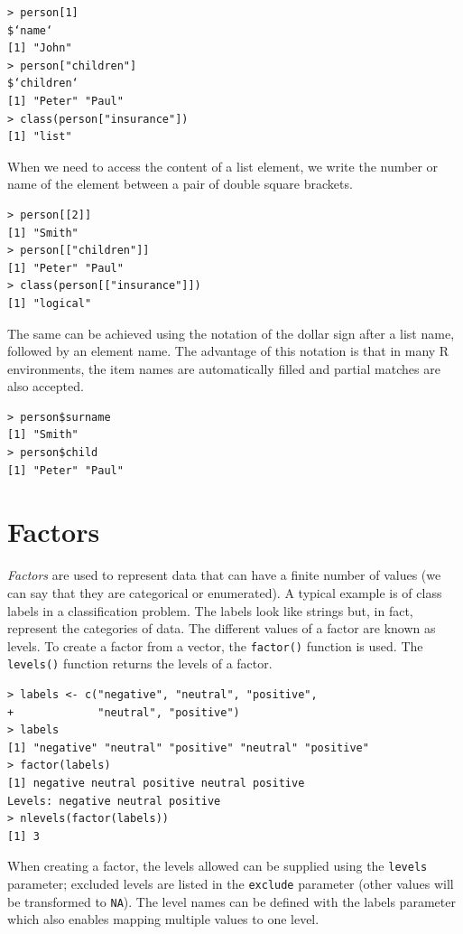 \begin{verbatim}
> person[1]
$‘name‘
[1] "John"
> person["children"]
$‘children‘
[1] "Peter" "Paul"
> class(person["insurance"])
[1] "list"
\end{verbatim}

When we need to access the content of a list element, we write the number or
name of the element between a pair of double square brackets.

\begin{verbatim}
> person[[2]]
[1] "Smith"
> person[["children"]]
[1] "Peter" "Paul"
> class(person[["insurance"]])
[1] "logical"
\end{verbatim}

The same can be achieved using the notation of the dollar sign after a list
name, followed by an element name. The advantage of this notation is that
in many R environments, the item names are automatically filled and partial
matches are also accepted.

\begin{verbatim}
> person$surname
[1] "Smith"
> person$child
[1] "Peter" "Paul"
\end{verbatim}

\section{Factors}

\textit{Factors} are used to represent data that can have a finite number of values 
(we can say that they are categorical or enumerated). 
A typical example is of class labels in a classification problem. 
The labels look like strings but, in fact, represent the categories of data. 
The different values of a factor are known as levels. 
To create a factor from a vector, the \texttt{factor()} function is used. 
The \texttt{levels()} function returns the levels of a factor.

\begin{verbatim}
> labels <- c("negative", "neutral", "positive",
+             "neutral", "positive")
> labels
[1] "negative" "neutral" "positive" "neutral" "positive"
> factor(labels)
[1] negative neutral positive neutral positive
Levels: negative neutral positive
> nlevels(factor(labels))
[1] 3
\end{verbatim}  

When creating a factor, the levels allowed can be supplied using the \texttt{levels}
parameter; excluded levels are listed in the \texttt{exclude} parameter (other values
will be transformed to \texttt{NA}). The level names can be defined with the labels
parameter which also enables mapping multiple values to one level.

